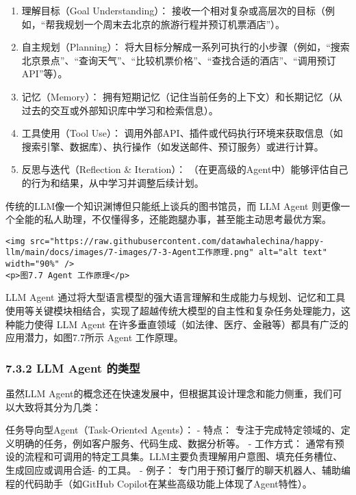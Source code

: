 \documentclass[
]{article}
\providecommand{\tightlist}{%
  \setlength{\itemsep}{0pt}\setlength{\parskip}{0pt}}
\begin{document}
\begin{enumerate}
\def\labelenumi{\arabic{enumi}.}
\tightlist
\item
  理解目标（Goal Understanding）：
  接收一个相对复杂或高层次的目标（例如，``帮我规划一个周末去北京的旅游行程并预订机票酒店''）。
\item
  自主规划（Planning）：
  将大目标分解成一系列可执行的小步骤（例如，``搜索北京景点''、``查询天气''、``比较机票价格''、``查找合适的酒店''、``调用预订API''等）。
\item
  记忆（Memory）：
  拥有短期记忆（记住当前任务的上下文）和长期记忆（从过去的交互或外部知识库中学习和检索信息）。
\item
  工具使用（Tool Use）：
  调用外部API、插件或代码执行环境来获取信息（如搜索引擎、数据库）、执行操作（如发送邮件、预订服务）或进行计算。
\item
  反思与迭代（Reflection \& Iteration）：
  （在更高级的Agent中）能够评估自己的行为和结果，从中学习并调整后续计划。
\end{enumerate}

传统的LLM像一个知识渊博但只能纸上谈兵的图书馆员，而 LLM Agent
则更像一个全能的私人助理，不仅懂得多，还能跑腿办事，甚至能主动思考最优方案。

\begin{verbatim}
<img src="https://raw.githubusercontent.com/datawhalechina/happy-llm/main/docs/images/7-images/7-3-Agent工作原理.png" alt="alt text" width="90%" />
<p>图7.7 Agent 工作原理</p>
\end{verbatim}

LLM Agent
通过将大型语言模型的强大语言理解和生成能力与规划、记忆和工具使用等关键模块相结合，实现了超越传统大模型的自主性和复杂任务处理能力，这种能力使得
LLM Agent
在许多垂直领域（如法律、医疗、金融等）都具有广泛的应用潜力，如图7.7所示
Agent 工作原理。

\subsubsection{7.3.2 LLM Agent
的类型}\label{llm-agent-ux7684ux7c7bux578b}

虽然LLM
Agent的概念还在快速发展中，但根据其设计理念和能力侧重，我们可以大致将其分为几类：

任务导向型Agent（Task-Oriented Agents）： - 特点：
专注于完成特定领域的、定义明确的任务，例如客户服务、代码生成、数据分析等。
- 工作方式：
通常有预设的流程和可调用的特定工具集。LLM主要负责理解用户意图、填充任务槽位、生成回应或调用合适-
的工具。 - 例子：
专门用于预订餐厅的聊天机器人、辅助编程的代码助手（如GitHub
Copilot在某些高级功能上体现了Agent特性）。
\end{document}
